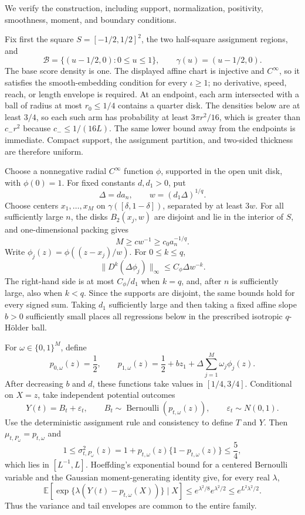 We verify the construction, including support, normalization, positivity, smoothness, moment, and boundary conditions.

Fix first the square \(S=[-1/2,1/2]^2\), the two half-square assignment regions, and
\[
 \mathcal B=\{(u-1/2,0):0\leq u\leq1\},
 \qquad \gamma(u)=(u-1/2,0).
\]
The base score density is one.  The displayed affine chart is injective and \(C^\infty\), so it satisfies the smooth-embedding condition for every \(\iota\geq1\); no derivative, speed, reach, or length envelope is required.  At an endpoint, each arm intersected with a ball of radius at most \(r_0\leq1/4\) contains a quarter disk.  The densities below are at least \(3/4\), so each such arm has probability at least \(3\pi r^2/16\), which is greater than \(c_-r^2\) because \(c_-\leq1/(16L)\).  The same lower bound away from the endpoints is immediate.  Compact support, the assignment partition, and two-sided thickness are therefore uniform.

Choose a nonnegative radial \(C^\infty\) function \(\phi\), supported in the open unit disk, with \(\phi(0)=1\).  For fixed constants \(d,d_1>0\), put
\[
 \Delta=d a_n,
 \qquad w=(d_1\Delta)^{1/q}.
\]
Choose centers \(x_1,\ldots,x_M\) on \(\gamma([\delta,1-\delta])\), separated by at least \(3w\).  For all sufficiently large \(n\), the disks \(B_2(x_j,w)\) are disjoint and lie in the interior of \(S\), and one-dimensional packing gives
\[
 M\geq c w^{-1}\geq c_0a_n^{-1/q}.
\]
Write \(\phi_j(z)=\phi((z-x_j)/w)\).  For \(0\leq k\leq q\),
\[
 \lVert D^k(\Delta\phi_j)\rVert_\infty
 \leq C_\phi\Delta w^{-k}.
\]
The right-hand side is at most \(C_\phi/d_1\) when \(k=q\), and, after \(n\) is sufficiently large, also when \(k<q\).  Since the supports are disjoint, the same bounds hold for every signed sum.  Taking \(d_1\) sufficiently large and then taking a fixed affine slope \(b>0\) sufficiently small places all regressions below in the prescribed isotropic \(q\)-H\"older ball.

For \(\omega\in\{0,1\}^M\), define
\[
 p_{0,\omega}(z)=\frac12,
 \qquad
 p_{1,\omega}(z)=\frac12+bz_1+\Delta\sum_{j=1}^M\omega_j\phi_j(z).
\]
After decreasing \(b\) and \(d\), these functions take values in \([1/4,3/4]\).  Conditional on \(X=z\), take independent potential outcomes
\[
 Y(t)=B_t+\varepsilon_t,
 \qquad B_t\sim\operatorname{Bernoulli}(p_{t,\omega}(z)),
 \qquad \varepsilon_t\sim N(0,1).
\]
Use the deterministic assignment rule and consistency to define \(T\) and \(Y\).  Then \(\mu_{t,P_\omega}=p_{t,\omega}\) and
\[
 1\leq\sigma^2_{t,P_\omega}(z)
 =1+p_{t,\omega}(z)\{1-p_{t,\omega}(z)\}
 \leq\frac54,
\]
which lies in \([L^{-1},L]\).  Hoeffding's exponential bound for a centered Bernoulli variable and the Gaussian moment-generating identity give, for every real \(\lambda\),
\[
 \mathbb E\!\left[\exp\{\lambda(Y(t)-p_{t,\omega}(X))\}\mid X\right]
 \leq e^{\lambda^2/8}e^{\lambda^2/2}
 \leq e^{L^2\lambda^2/2}.
\]
Thus the variance and tail envelopes are common to the entire family.

